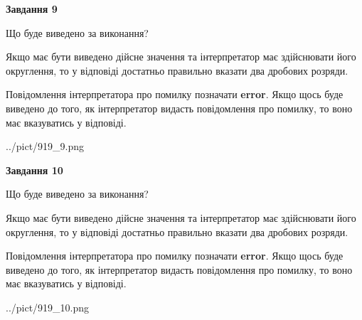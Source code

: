 \documentclass[12pt, ukrainian]{article}
\begin{document}
{\begin {Large}
{\begin {center}\textbf{Завдання 9}\end {center}}\par
Що буде виведено за виконання? \par

Якщо має бути виведено дійсне значення та інтерпретатор має здійснювати його округлення, 
то у відповіді достатньо правильно вказати два дробових розряди.

Повідомлення інтерпретатора про помилку позначати \textbf{error}.
Якщо щось буде виведено до того, як інтерпретатор видасть повідомлення про помилку, 
то воно має вказуватись у відповіді. \par

\begin{center}
	{../pict/919_9.png}
\end{center}
\newpage

{\begin {center}\textbf{Завдання 10}\end {center}}\par
Що буде виведено за виконання? \par

Якщо має бути виведено дійсне значення та інтерпретатор має здійснювати його округлення, 
то у відповіді достатньо правильно вказати два дробових розряди.

Повідомлення інтерпретатора про помилку позначати \textbf{error}.
Якщо щось буде виведено до того, як інтерпретатор видасть повідомлення про помилку, 
то воно має вказуватись у відповіді. \par

\begin{center}
	{../pict/919_10.png}
\end{center}
\newpage

\end {Large}}
\end{document}
